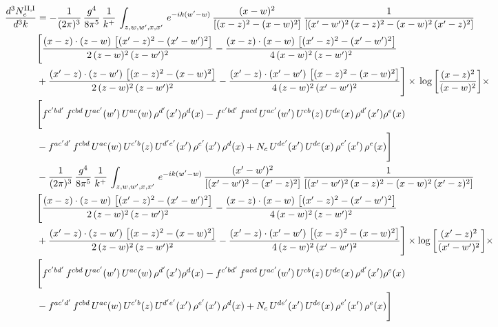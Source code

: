 \documentclass[9pt]{article}
\numberwithin{equation}{section}
\begin{document}
\begin{align}
 \frac{d^{3}N^{\rm II,I}_{e}}{d^{3}k}  & =   -\frac{1}{(2\pi)^{3}}\, \frac{g^{4}}{8\pi^{5}}\,\frac{1}{k^{+}}\,\int_{z,w,w^{\prime},x,x'}\, e^{-ik(w^{\prime}-w)}\,\frac{(x-w)^{2}}{\left[(x-z)^{2}-(x-w)^{2}\right]}\, \frac{1}{\left[(x'-w')^{2}\, (x-z)^{2} - (x-w)^{2}\, (x'-z)^{2}\right]} \notag \\ & \Bigg[\frac{(x-z)\cdot (z-w)\, \left[(x'-z)^{2}-(x'-w')^{2}\right]}{2\, (z-w)^{2}\, (z-w')^{2}}  - \frac{(x-z)\cdot (x-w)\,\left[(x'-z)^{2}-(x'-w')^{2}\right] }{4\,(x-w)^{2}\,(z-w')^{2}}\notag \\ & +\frac{(x'-z)\cdot (z-w')\, \left[(x-z)^{2}-(x-w)^{2}\right]}{2\, (z-w)^{2}\, (z-w')^{2}}-\frac{(x'-z)\cdot (x'-w')\, \left[(x-z)^{2}-(x-w)^{2}\right]}{4\, (z-w)^{2}\,(x'-w')^{2}}\Bigg]\times\, \log{\left[\frac{(x-z)^{2}}{(x-w)^{2}}\right]}\times\,\notag \\ & \Bigg[f^{c'bd'}\,f^{cbd}\, U^{ac'}(w')\,U^{ac}(w)\,\rho^{d'}(x')\rho^{d}(x)- f^{c'bd'}\,f^{acd}\,U^{ac'}(w')\,U^{cb}(z)\,U^{de}(x)\,\rho^{d'}(x')\rho^{e}(x) \notag \\ & -f^{ac'd'}\,f^{cbd}\,U^{ac}(w)\,U^{c'b}(z)\,U^{d'e'}(x')\,\rho^{e'}(x')\,\rho^{d}(x) +N_{c}\,U^{de'}(x')\,U^{de}(x)\,\rho^{e'}(x')\,\rho^{e}(x)\Bigg] \notag \\
& -\frac{1}{(2\pi)^{3}}\, \frac{g^{4}}{8\pi^{5}}\,\frac{1}{k^{+}}\,\int_{z,w,w^{\prime},x,x'}\, e^{-ik(w^{\prime}-w)}\, \frac{(x'-w')^{2}}{\left[(x'-w')^{2}-(x'-z)^{2}\right]}\, \frac{1}{\left[(x'-w')^{2}\, (x-z)^{2} - (x-w)^{2}\, (x'-z)^{2}\right]}  \notag \\ & \Bigg[\frac{(x-z)\cdot (z-w)\, \left[(x'-z)^{2}-(x'-w')^{2}\right]}{2\, (z-w)^{2}\, (z-w')^{2}}  - \frac{(x-z)\cdot (x-w)\,\left[(x'-z)^{2}-(x'-w')^{2}\right] }{4\,(x-w)^{2}\,(z-w')^{2}}\notag \\ & +\frac{(x'-z)\cdot (z-w')\, \left[(x-z)^{2}-(x-w)^{2}\right]}{2\, (z-w)^{2}\, (z-w')^{2}}-\frac{(x'-z)\cdot (x'-w')\, \left[(x-z)^{2}-(x-w)^{2}\right]}{4\, (z-w)^{2}\,(x'-w')^{2}}\Bigg]\times \log{\left[\frac{(x'-z)^{2}}{(x'-w')^{2}}\right]}\times\notag \\ & \Bigg[f^{c'bd'}\,f^{cbd}\, U^{ac'}(w')\,U^{ac}(w)\,\rho^{d'}(x')\rho^{d}(x)- f^{c'bd'}\,f^{acd}\,U^{ac'}(w')\,U^{cb}(z)\,U^{de}(x)\,\rho^{d'}(x')\rho^{e}(x) \notag \\ & -f^{ac'd'}\,f^{cbd}\,U^{ac}(w)\,U^{c'b}(z)\,U^{d'e'}(x')\,\rho^{e'}(x')\,\rho^{d}(x) +N_{c}\,U^{de'}(x')\,U^{de}(x)\,\rho^{e'}(x')\,\rho^{e}(x)\Bigg]
\end{align}
\end{document}
